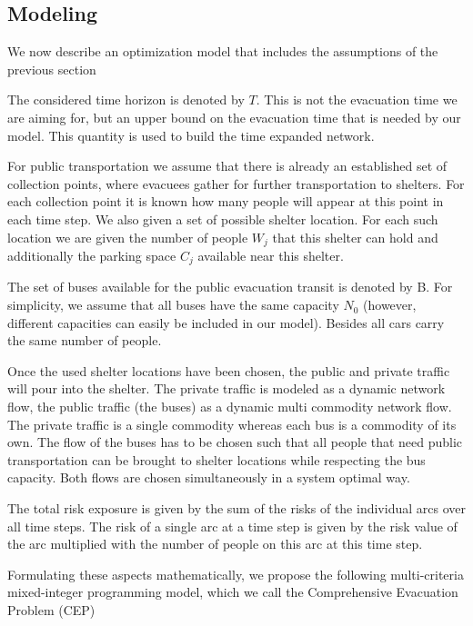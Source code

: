 \documentclass{mcmthesis}
\begin{document}
\subsection{Modeling}

We now describe an optimization model that includes the assumptions of the previous section %

The considered time horizon is denoted by $T$. This is not the evacuation time we are aiming for, but an upper bound on the evacuation time that is needed by our model. This quantity is used to build the time expanded network.

For public transportation we assume that there is already an established set of collection points, where evacuees gather for further transportation to shelters. For each collection point it is known how many people will appear at this point in each time step. We also given a set of possible shelter location. For each such location we are given the number of people ${W_j}$ that this shelter can hold and additionally the parking space ${C_j}$ available near this shelter.

The set of buses available for the public evacuation transit is denoted by B. For simplicity, we assume that all buses have the same capacity ${N_0}$ (however, different capacities can easily be included in our model). Besides all cars carry the same number of people.

Once the used shelter locations have been chosen, the public and private traffic will pour into the shelter. The private traffic is modeled as a dynamic network flow, the public traffic (the buses) as a dynamic multi commodity network flow. The private traffic is a single commodity whereas each bus is a commodity of its own. The flow of the buses has to be chosen such that all people that need public transportation can be brought to shelter locations while respecting the bus capacity. Both flows are chosen simultaneously in a system optimal way.

The total risk exposure is given by the sum of the risks of the individual arcs over all time steps. The risk of a single arc at a time step is given by the risk value of the arc multiplied with the number of people on this arc at this time step.

Formulating these aspects mathematically, we propose the following multi-criteria mixed-integer programming model, which we call the Comprehensive Evacuation Problem (CEP)\cite{Murray2013Evacuation,Ng2015Sharp,Ng2010Reliable}
\end{document}
